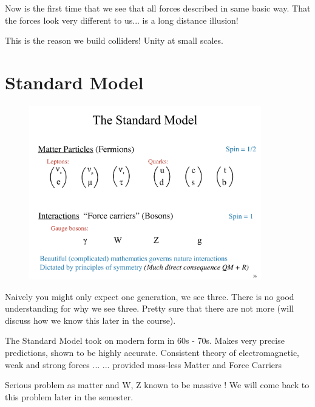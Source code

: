 {Now is the first time that we see that all forces described in same basic way.
That the forces look very different to us... is a long distance illusion!

This is the reason we build colliders! Unity at small scales.

\section{Standard Model}


\begin{figure}[h]
\centering
\includegraphics[width=0.9\textwidth]{./SM.pdf}
\end{figure}

Naively you might only expect one generation, we see three. 
There is no good understanding for why we see three. 
Pretty sure that there are not more (will discuss how we know this later in the course).

The Standard Model took on modern form in 60s - 70s.
Makes very precise predictions, shown to be highly accurate.
Consistent theory of electromagnetic, weak and strong forces ...
... provided mass-less Matter and Force Carriers


Serious problem as matter and W, Z known to be massive !
We will come back to this problem later in the semester.

}




